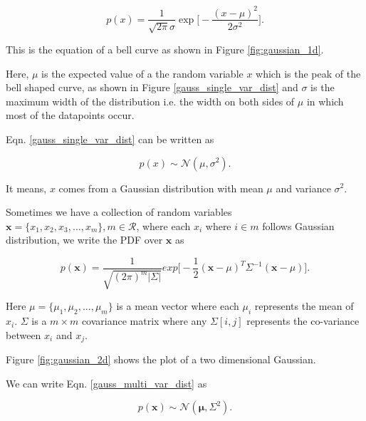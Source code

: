\documentclass[english]{tktltiki}
\begin{document}
\begin{equation}
p(x) = \frac{1}{\sqrt{2 \pi}\sigma} \exp \Big[-\frac{(x - \mu)^2}{2 \sigma^2}\Big]
\label{gauss_single_var_dist}.
\end{equation}



This is the equation of a bell curve as shown in Figure \ref{fig:gaussian_1d}.

Here, $\mu$ is the expected value of a the random variable $x$ which is the peak of the bell shaped curve, as shown in Figure \ref{gauss_single_var_dist} and $\sigma$ is the maximum width of the distribution i.e. the width on both sides of $\mu$ in which most of the datapoints occur.

Eqn. \ref{gauss_single_var_dist} can be written as

\begin{equation}
p(x) \sim \mathcal{N}(\mu, \sigma^2).
\label{gauss_single_var_sym}
\end{equation}

It means, $x$ comes from a Gaussian distribution with mean $\mu$ and variance $\sigma^2$.

Sometimes we have a collection of random variables $\mathbf{x} = \{x_1, x_2, x_3, ..., x_m\}, m \in \mathcal{R}$, where each $x_i$ where $i \in m$ follows Gaussian distribution, we write the PDF over $\mathbf{x}$ as

\begin{equation}
p(\mathbf{x}) = \frac{1}{\sqrt{(2 \pi)^m |\Sigma|}}exp \Big[-\frac{1}{2}(\mathbf{x} - \mu)^T \Sigma^{-1} (\mathbf{x} - \mu) \Big].
\label{gauss_multi_var_dist}
\end{equation}

Here $\mu = \{\mu_1, \mu_2, ..., \mu_m\}$ is a mean vector where each $\mu_i$ represents the mean of $x_i$. $\Sigma$ is a $m \times m$ covariance matrix where any $\Sigma[i, j]$ represents the co-variance between $x_i$ and $x_j$.

Figure \ref{fig:gaussian_2d} shows the plot of a two dimensional Gaussian.

We can write Eqn. \ref{gauss_multi_var_dist} as

\begin{equation}
p(\mathbf{x}) \sim \mathcal{N}(\mathbf{\mu}, \Sigma^2).
\label{gauss_multi_var_sym}
\end{equation}
\end{document}

